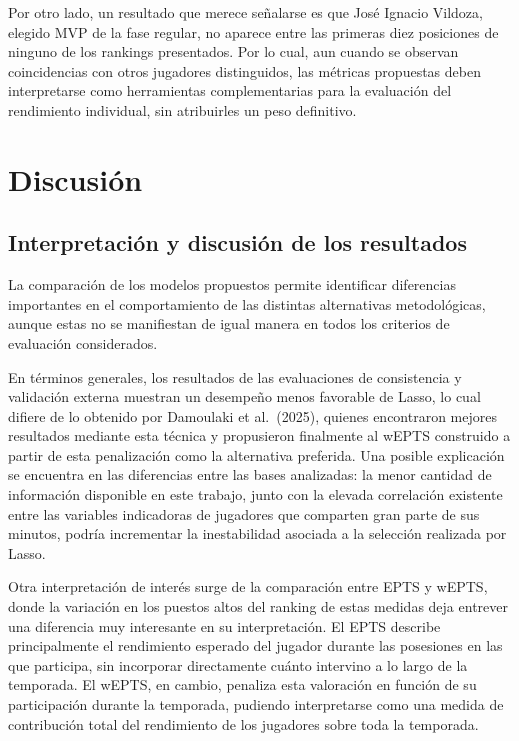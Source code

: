 \documentclass[
  12pt,
]{article}
\begin{document}
Por otro lado, un resultado que merece señalarse es que José Ignacio
Vildoza, elegido MVP de la fase regular, no aparece entre las primeras
diez posiciones de ninguno de los rankings presentados. Por lo cual, aun
cuando se observan coincidencias con otros jugadores distinguidos, las
métricas propuestas deben interpretarse como herramientas
complementarias para la evaluación del rendimiento individual, sin
atribuirles un peso definitivo.

\newpage

\section{Discusión}\label{cap:discusion}

\subsection{Interpretación y discusión de los
resultados}\label{interpretaciuxf3n-y-discusiuxf3n-de-los-resultados}

La comparación de los modelos propuestos permite identificar diferencias
importantes en el comportamiento de las distintas alternativas
metodológicas, aunque estas no se manifiestan de igual manera en todos
los criterios de evaluación considerados.

En términos generales, los resultados de las evaluaciones de
consistencia y validación externa muestran un desempeño menos favorable
de Lasso, lo cual difiere de lo obtenido por Damoulaki et al.~(2025),
quienes encontraron mejores resultados mediante esta técnica y
propusieron finalmente al wEPTS construido a partir de esta penalización
como la alternativa preferida. Una posible explicación se encuentra en
las diferencias entre las bases analizadas: la menor cantidad de
información disponible en este trabajo, junto con la elevada correlación
existente entre las variables indicadoras de jugadores que comparten
gran parte de sus minutos, podría incrementar la inestabilidad asociada
a la selección realizada por Lasso.

Otra interpretación de interés surge de la comparación entre EPTS y
wEPTS, donde la variación en los puestos altos del ranking de estas
medidas deja entrever una diferencia muy interesante en su
interpretación. El EPTS describe principalmente el rendimiento esperado
del jugador durante las posesiones en las que participa, sin incorporar
directamente cuánto intervino a lo largo de la temporada. El wEPTS, en
cambio, penaliza esta valoración en función de su participación durante
la temporada, pudiendo interpretarse como una medida de contribución
total del rendimiento de los jugadores sobre toda la temporada.
\end{document}
